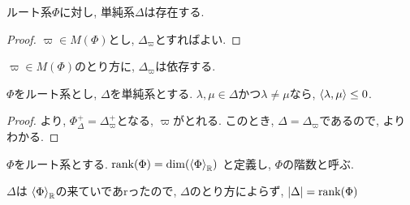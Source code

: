 \begin{cor}
  ルート系$\Phi$に対し, 単純系$\Delta$は存在する.
\end{cor}
\begin{proof}
  $\varpi\in M(\Phi)$とし, $\Delta_\varpi$とすればよい.
\end{proof}
\begin{remark}
  $\varpi\in M(\Phi)$のとり方に, $\Delta_\varpi$は依存する.
\end{remark}

\begin{theorem}
  $\Phi$をルート系とし,
  $\Delta$を単純系とする.
  $\lambda,\mu\in\Delta$かつ$\lambda\neq \mu$なら, $\Braket{\lambda,\mu}\leq 0$.
  
\end{theorem}
\begin{proof}
  より,
  $\Phi_\Delta^+=\Delta_\varpi^+$となる, $\varpi$がとれる.
  このとき, $\Delta=\Delta_\varpi$であるので,
  よりわかる.
\end{proof}



\begin{definition}
  $\Phi$をルート系とする.
  $\operatorname{rank}(\Phi)=\dim(\Braket{\Phi}_{\mathbb{R}})$
  と定義し, $\Phi$の階数と呼ぶ.
\end{definition}

\begin{remark}
  $\Delta$は
  $\Braket{\Phi}_{\mathbb{R}}$の来ていであrったので,
  $\Delta$のとり方によらず,
  $\left|\Delta\right|=\operatorname{rank}(\Phi)$
\end{remark}


